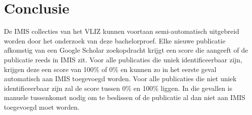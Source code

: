 
\chapter{Conclusie}%
\label{ch:conclusie}

De IMIS collecties van het VLIZ kunnen voortaan semi-automatisch uitgebreid worden door het onderzoek van deze bachelorproef. Elke nieuwe publicatie afkomstig van een Google Scholar zoekopdracht krijgt een score die aangeeft of de publicatie reeds in IMIS zit. Voor alle publicaties die uniek identificeerbaar zijn, krijgen deze een score van 100\% of 0\% en kunnen zo in het eerste geval automatisch aan IMIS toegevoegd worden. Voor alle publicaties die niet uniek identificeerbaar zijn zal de score tussen 0\% en 100\% liggen. In die gevallen is manuele tussenkomst nodig om te beslissen of de publicatie al dan niet aan IMIS toegevoegd moet worden.  
\lipsum[76-80]

